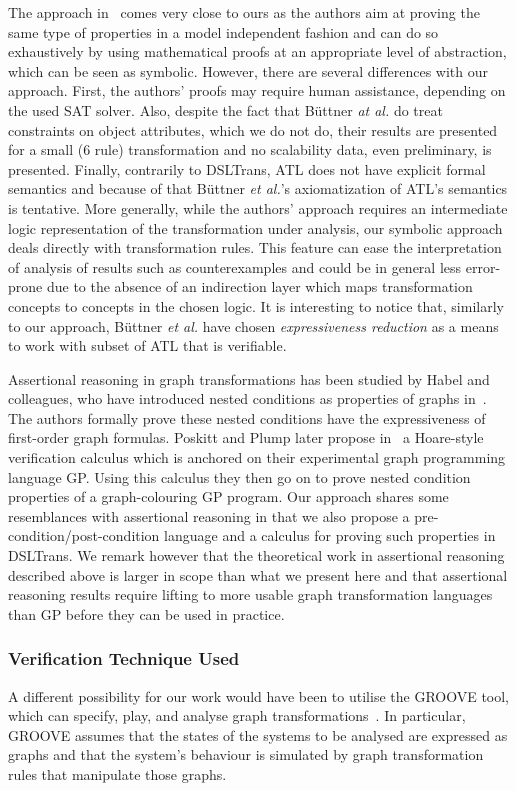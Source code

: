 The approach in~\cite{ButtnerEC12} comes very close to ours as the authors aim at proving the same type of properties in a model independent fashion and can do so exhaustively by using mathematical proofs at an appropriate level of abstraction, which can be seen as symbolic. However, there are several differences with our approach. First, the authors' proofs may require human assistance, depending on the used SAT solver. Also, despite the fact that B\"uttner \emph{at al.} do treat constraints on object attributes, which we do not do, their results are presented for a small (6 rule) transformation and no scalability data, even preliminary, is presented. Finally, contrarily to DSLTrans, ATL does not have explicit formal semantics and because of that B\"uttner \emph{et al.}'s axiomatization of ATL's semantics is tentative. More generally, while the authors' approach requires an intermediate logic representation of the transformation under analysis, our symbolic approach deals directly with transformation rules. This feature can ease the interpretation of analysis of results such as counterexamples and could be in general less error-prone due to the absence of an indirection layer which maps transformation concepts to concepts in the chosen logic. It is interesting to notice that, similarly to our approach, B\"uttner \emph{et al.} have chosen \emph{expressiveness reduction} as a means to work with subset of ATL that is verifiable.

Assertional reasoning in graph transformations has been studied by Habel and colleagues, who have introduced nested conditions as properties of graphs in~\cite{Habel:2009}. The authors formally prove these nested conditions have the expressiveness of first-order graph formulas. Poskitt and Plump later propose in~\cite{PoskittP12} a Hoare-style verification calculus which is anchored on their experimental graph programming language GP. Using this calculus they then go on to prove nested condition properties of a graph-colouring GP program. Our approach shares some resemblances with assertional reasoning in that we also propose a pre-condition/post-condition language and a calculus for proving such properties in DSLTrans. We remark however that the theoretical work in assertional reasoning described above is larger in scope than what we present here and that assertional reasoning results require lifting to more usable graph transformation languages than GP before they can be used in practice. 

\subsubsection*{Verification Technique Used} A different possibility for our work would have been to utilise the GROOVE tool, which can specify, play, and analyse graph transformations~\cite{rensink:2012}. In particular, GROOVE assumes that the states of the systems to be analysed are expressed as graphs and that the system's behaviour is simulated by graph transformation rules that manipulate those graphs.


